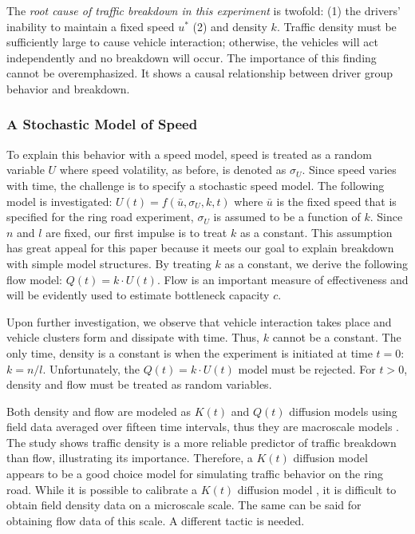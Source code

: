 \documentclass[Proceedings]{ascelike}
\begin{document}
The \emph{root cause of traffic breakdown in this experiment} is twofold: (1) the drivers' inability to maintain  a fixed speed $u^*$ (2) and density $k$. Traffic density must be sufficiently large to cause vehicle interaction; otherwise, the vehicles will act independently and no breakdown will occur. The importance of this finding cannot be overemphasized. It shows a causal relationship between driver group behavior and breakdown.

\subsubsection{A Stochastic Model of Speed}

To explain this behavior with a speed model, speed is treated as a random variable $U$ where speed volatility, as before, is denoted as $\sigma_U$.  Since speed varies with time, the challenge is  to specify a stochastic speed model. The following model is investigated: $U(t) = f(\bar{u},\sigma_U,k,t)$ where $\bar{u}$ is the fixed speed that is specified for the ring road experiment, $\sigma_U$ is assumed to be a function of $k$. Since $n$ and $l$ are fixed, our first impulse is to treat $k$ as a constant. This assumption has great appeal for this paper because it meets our goal to explain breakdown with simple model structures. By treating  $k$ as a constant,  we derive the following flow model: $Q(t) = k \cdot U(t)$. Flow is an important measure of effectiveness and will be evidently used to estimate bottleneck capacity $c$.

Upon further investigation, we observe that vehicle interaction  takes place and vehicle clusters form and dissipate with time. Thus, $k$ cannot be a constant. The only time, density is a constant is when the experiment is initiated at time $t = 0$: $k = n/l$. Unfortunately, the $Q(t) = k \cdot U(t)$ model must be rejected. For $t > 0$, density and flow must be treated as random variables. 

Both density and flow are modeled as $K(t)$ and $Q(t)$ diffusion models using field data averaged over fifteen time intervals, thus they are macroscale models  \cite{pjo2017}. The study shows traffic density is a more reliable predictor of traffic breakdown than flow, illustrating its  importance. Therefore,  a $K(t)$ diffusion model appears to be a good choice model for simulating traffic behavior on the ring road.  While it is possible  to calibrate a $K(t)$ diffusion model \cite{KISH2000271}, it is difficult to obtain field density data on a microscale scale. The same can be said for obtaining flow data of this scale. A different tactic is needed.
\end{document}
